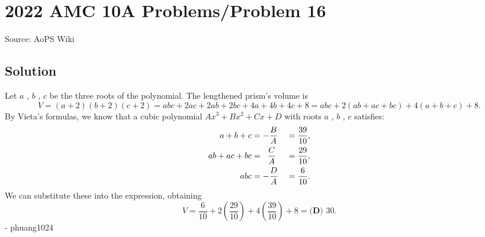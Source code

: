\documentclass[12pt]{article}
\begin{document}
\section*{{2022 AMC 10A Problems/Problem 16}}
Source: AoPS Wiki

\subsection*{Solution}
Let $a$ , $b$ , $c$ be the three roots of the polynomial. The lengthened prism's volume is \[V = (a+2)(b+2)(c+2) = abc+2ac+2ab+2bc+4a+4b+4c+8 = abc + 2(ab+ac+bc) + 4(a+b+c) + 8.\] By Vieta's formulas, we know that a cubic polynomial $Ax^3+Bx^2+Cx+D$ with roots $a$ , $b$ , $c$ satisfies: \begin{alignat*}{8} a+b+c &= -\frac{B}{A} &&= \frac{39}{10}, \\ ab+ac+bc &= \hspace{2mm}\frac{C}{A} &&= \frac{29}{10}, \\ abc &= -\frac{D}{A} &&= \frac{6}{10}. \end{alignat*} We can substitute these into the expression, obtaining \[V = \frac{6}{10} + 2\left(\frac{29}{10}\right) + 4\left(\frac{39}{10}\right) + 8 = \boxed{\textbf{(D) } 30}.\] - phuang1024
\end{document}
